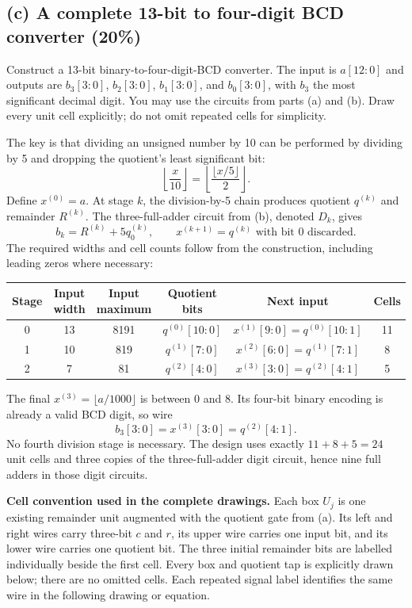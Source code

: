 \subsection{(c) A complete 13-bit to four-digit BCD converter (20\%)}
\begin{question}
Construct a 13-bit binary-to-four-digit-BCD converter. The input is $a[12:0]$ and outputs are $b_3[3:0]$, $b_2[3:0]$, $b_1[3:0]$, and $b_0[3:0]$, with $b_3$ the most significant decimal digit. You may use the circuits from parts (a) and (b). Draw every unit cell explicitly; do not omit repeated cells for simplicity.
\end{question}
\begin{solution}
The key is that dividing an unsigned number by 10 can be performed by dividing by 5 and dropping the quotient's least significant bit:
\[
\left\lfloor\frac{x}{10}\right\rfloor
=\left\lfloor\frac{\lfloor x/5\rfloor}{2}\right\rfloor.
\]
Define $x^{(0)}=a$. At stage $k$, the division-by-5 chain produces quotient $q^{(k)}$ and remainder $R^{(k)}$. The three-full-adder circuit from (b), denoted $D_k$, gives
\[
b_k=R^{(k)}+5q^{(k)}_0,\qquad
x^{(k+1)}=q^{(k)}\text{ with bit 0 discarded}.
\]
The required widths and cell counts follow from the construction, including leading zeros where necessary:
\begin{center}
\small\setlength{\tabcolsep}{4pt}
\begin{tabular}{c c c c c c}
\toprule
Stage & Input width & Input maximum & Quotient bits & Next input & Cells\\
\midrule
0&13&8191&$q^{(0)}[10:0]$&$x^{(1)}[9:0]=q^{(0)}[10:1]$&11\\
1&10&819&$q^{(1)}[7:0]$&$x^{(2)}[6:0]=q^{(1)}[7:1]$&8\\
2&7&81&$q^{(2)}[4:0]$&$x^{(3)}[3:0]=q^{(2)}[4:1]$&5\\
\bottomrule
\end{tabular}
\end{center}
The final $x^{(3)}=\lfloor a/1000\rfloor$ is between 0 and 8. Its four-bit binary encoding is already a valid BCD digit, so wire
\[
\boxed{b_3[3:0]=x^{(3)}[3:0]=q^{(2)}[4:1].}
\]
No fourth division stage is necessary. The design uses exactly $11+8+5=24$ unit cells and three copies of the three-full-adder digit circuit, hence nine full adders in those digit circuits.

\textbf{Cell convention used in the complete drawings.} Each box $U_j$ is one existing remainder unit augmented with the quotient gate from (a). Its left and right wires carry three-bit $c$ and $r$, its upper wire carries one input bit, and its lower wire carries one quotient bit. The three initial remainder bits are labelled individually beside the first cell. Every box and quotient tap is explicitly drawn below; there are no omitted cells. Each repeated signal label identifies the same wire in the following drawing or equation.


\end{solution}
